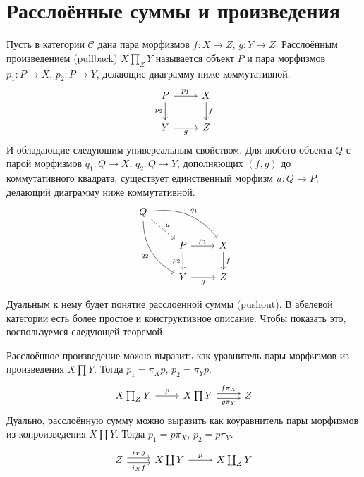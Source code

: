\documentclass[../main.tex]{subfiles}
\begin{document}
\section{Расслоённые суммы и произведения}
\begin{to_def}\label{A:pullback_def}
Пусть в категории $\mathcal{C}$ дана пара морфизмов $f:X\to Z$, $g:Y\to Z$. Расслоённым произведением (pullback) $X\prod_Z Y$ называется объект $P$ и пара морфизмов $p_1:P \to X$, $p_2:P\to Y$, делающие диаграмму ниже коммутативной.
\begin{equation}\label{A:pullback_comm}
    \begin{tikzcd}
	P & X \\
	Y & Z
	\arrow["g"', from=2-1, to=2-2]
	\arrow["f", from=1-2, to=2-2]
	\arrow["{p_1}", from=1-1, to=1-2]
	\arrow["{p_2}"', from=1-1, to=2-1]
\end{tikzcd}
\end{equation}
И обладающие следующим универсальным свойством. Для любого объекта $Q$ с парой морфизмов $q_1:Q\to X$, $q_2:Q\to Y$, дополняющих $(f, g)$ до коммутативного квадрата, существует единственный морфизм $u: Q\to P$, делающий диаграмму ниже коммутативной.
\begin{equation}\label{A:pullback_univ}
\begin{tikzcd}
	Q \\
	& P & X \\
	& Y & Z
	\arrow["{p_2}"', from=2-2, to=3-2]
	\arrow["g"', from=3-2, to=3-3]
	\arrow["f", from=2-3, to=3-3]
	\arrow["{p_1}", from=2-2, to=2-3]
	\arrow["{q_1}", bend left, from=1-1, to=2-3]
	\arrow["{q_2}"', bend right, from=1-1, to=3-2]
	\arrow["u", dashed, from=1-1, to=2-2]
\end{tikzcd}
\end{equation}
\end{to_def}
Дуальным к нему будет понятие расслоенной суммы (pushout). В абелевой категории есть более простое и конструктивное описание. Чтобы показать это, воспользуемся следующей теоремой.
\begin{to_thr}\label{A:pull_as_coeq}
Расслоённое произведение можно выразить как уравнитель пары морфизмов из произведения $X\prod Y$. Тогда $p_1 = \pi_X p$, $p_2 = \pi_Y p$.
\begin{equation*}
    \begin{tikzcd}
	{X\prod_ZY} & {X\prod Y} & Z
	\arrow["{f\pi_X}", shift left=1, from=1-2, to=1-3]
	\arrow["{g\pi_Y}"', shift right=1, from=1-2, to=1-3]
	\arrow["p", from=1-1, to=1-2]
\end{tikzcd}
\end{equation*}
Дуально, расслоённую сумму можно выразить как коуравнитель пары морфизмов из копроизведения $X\coprod Y$. Тогда $p_1 = p\pi_X$, $p_2 = p\pi_Y$.
\begin{equation*}
    \begin{tikzcd}
	Z & {X\coprod Y} & {X\coprod_Z Y}
	\arrow["{i_X f}"', shift right=1, from=1-1, to=1-2]
	\arrow["{i_Yg}", shift left=1, from=1-1, to=1-2]
	\arrow["p", from=1-2, to=1-3]
\end{tikzcd}
\end{equation*}
\end{to_thr}
\end{document}
